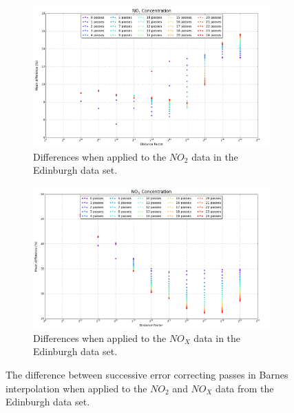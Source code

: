         	\begin{figure}
                \centering
                \begin{subfigure}{\textwidth}
                    \centering
                    \includegraphics[width=\linewidth]{./images/Barnes_Distance_Factor_NO2.png}
                    \caption{Differences when applied to the $NO_{2}$ data in the Edinburgh data set.}
                    \label{fig:barnes_distance_factor_results_NO2}
                \end{subfigure}
                \begin{subfigure}{\textwidth}
                    \includegraphics[width=\linewidth]{./images/Barnes_Distance_Factor_NOx.png}
                    \caption{Differences when applied to the $NO_{X}$ data in the Edinburgh data set.}
                    \label{fig:barnes_distance_factor_results_NOx}
                \end{subfigure}
                \caption{The difference between successive error correcting passes in Barnes interpolation when applied to the $NO_{2}$ and $NO_{X}$ data from the Edinburgh data set.}
                \label{fig:barnes_distance_factor_results_NO2_NOx}
            \end{figure}


